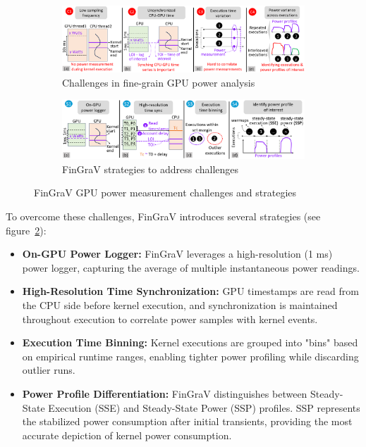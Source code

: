 \begin{figure}[H]
    \centering
    \begin{subfigure}{1\textwidth}
        \includegraphics[width=1\textwidth]{Figures/fingrav_challenges.png}
        \caption[Challenges in fine-grain GPU power analysis]{Challenges in fine-grain GPU power analysis}
        \label{fig:fingrav_challenges}
    \end{subfigure}
    \hfill
    \begin{subfigure}{1\textwidth}
        \includegraphics[width=1\textwidth]{Figures/fingrav_solutions.png}
        \caption[FinGraV strategies to address challenges]{FinGraV strategies to address challenges}
        \label{fig:fingrav_solutions}
    \end{subfigure}
    \caption[FinGraV GPU power measurement challenges and strategies]{FinGraV GPU power measurement challenges and strategies\parencite{singhania2024methodology}}
    \label{fig:fingrav_challenges_solutions}
\end{figure}

To overcome these challenges, FinGraV introduces several strategies (see figure~\ref{fig:fingrav_solutions}):
\begin{itemize}
    \item \textbf{On-GPU Power Logger:} FinGraV leverages a high-resolution (1 ms) power logger, capturing the average of multiple instantaneous power readings.
    \item \textbf{High-Resolution Time Synchronization:} GPU timestamps are read from the CPU side before kernel execution, and synchronization is maintained throughout execution to correlate power samples with kernel events.
    \item \textbf{Execution Time Binning:} Kernel executions are grouped into "bins" based on empirical runtime ranges, enabling tighter power profiling while discarding outlier runs.
    \item \textbf{Power Profile Differentiation:} FinGraV distinguishes between Steady-State Execution (SSE) and Steady-State Power (SSP) profiles. SSP represents the stabilized power consumption after initial transients, providing the most accurate depiction of kernel power consumption.
\end{itemize}

